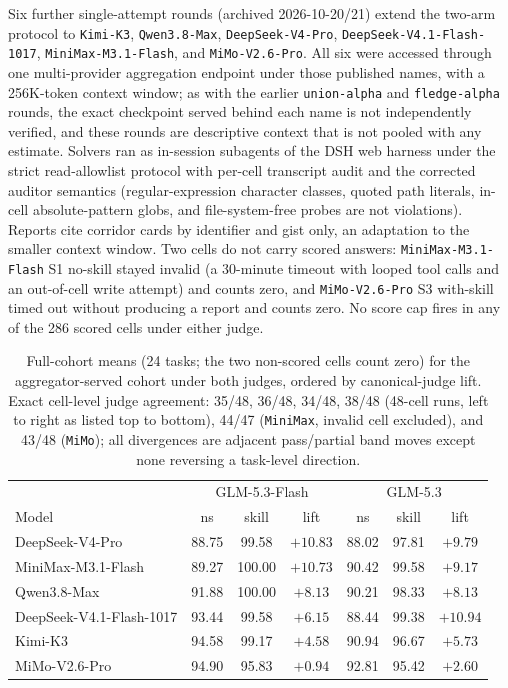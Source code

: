 \documentclass[11pt]{article}
\begin{document}
Six further single-attempt rounds (archived 2026-10-20/21) extend the two-arm protocol to \texttt{Kimi-K3}, \texttt{Qwen3.8-Max}, \texttt{DeepSeek-V4-Pro}, \texttt{DeepSeek-V4.1-Flash-1017}, \texttt{MiniMax-M3.1-Flash}, and \texttt{MiMo-V2.6-Pro}. All six were accessed through one multi-provider aggregation endpoint under those published names, with a 256K-token context window; as with the earlier \texttt{union-alpha} and \texttt{fledge-alpha} rounds, the exact checkpoint served behind each name is not independently verified, and these rounds are descriptive context that is not pooled with any estimate. Solvers ran as in-session subagents of the DSH web harness under the strict read-allowlist protocol with per-cell transcript audit and the corrected auditor semantics (regular-expression character classes, quoted path literals, in-cell absolute-pattern globs, and file-system-free probes are not violations). Reports cite corridor cards by identifier and gist only, an adaptation to the smaller context window. Two cells do not carry scored answers: \texttt{MiniMax-M3.1-Flash} S1 no-skill stayed invalid (a 30-minute timeout with looped tool calls and an out-of-cell write attempt) and counts zero, and \texttt{MiMo-V2.6-Pro} S3 with-skill timed out without producing a report and counts zero. No score cap fires in any of the 286 scored cells under either judge.

\begin{table}[t]
\centering
\small
\begin{tabular}{l ccc ccc}
\toprule
 & \multicolumn{3}{c}{GLM-5.3-Flash} & \multicolumn{3}{c}{GLM-5.3} \\
Model & ns & skill & lift & ns & skill & lift \\
\midrule
DeepSeek-V4-Pro & 88.75 & 99.58 & $+10.83$ & 88.02 & 97.81 & $+9.79$ \\
MiniMax-M3.1-Flash & 89.27 & 100.00 & $+10.73$ & 90.42 & 99.58 & $+9.17$ \\
Qwen3.8-Max & 91.88 & 100.00 & $+8.13$ & 90.21 & 98.33 & $+8.13$ \\
DeepSeek-V4.1-Flash-1017 & 93.44 & 99.58 & $+6.15$ & 88.44 & 99.38 & $+10.94$ \\
Kimi-K3 & 94.58 & 99.17 & $+4.58$ & 90.94 & 96.67 & $+5.73$ \\
MiMo-V2.6-Pro & 94.90 & 95.83 & $+0.94$ & 92.81 & 95.42 & $+2.60$ \\
\bottomrule
\end{tabular}
\caption{Full-cohort means (24 tasks; the two non-scored cells count zero) for the aggregator-served cohort under both judges, ordered by canonical-judge lift. Exact cell-level judge agreement: 35/48, 36/48, 34/48, 38/48 (48-cell runs, left to right as listed top to bottom), 44/47 (\texttt{MiniMax}, invalid cell excluded), and 43/48 (\texttt{MiMo}); all divergences are adjacent pass/partial band moves except none reversing a task-level direction.}
\label{tab:newmodel_means}
\end{table}
\end{document}
